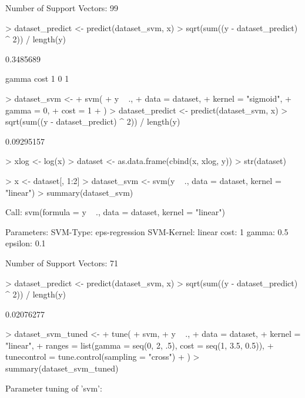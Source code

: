 \documentclass{article}
\begin{document}
\begin{Schunk}
\begin{Soutput}
Number of Support Vectors:  99
\end{Soutput}
\begin{Sinput}
> dataset_predict <- predict(dataset_svm, x)
> sqrt(sum((y - dataset_predict) ^ 2)) / length(y)
\end{Sinput}
\begin{Soutput}
[1] 0.3485689
\end{Soutput}
\begin{Soutput}
  gamma cost
1     0    1
\end{Soutput}
\begin{Sinput}
> dataset_svm <-
+   svm(
+     y ~ .,
+     data = dataset,
+     kernel = "sigmoid",
+     gamma = 0,
+     cost = 1
+   )
> dataset_predict <- predict(dataset_svm, x)
> sqrt(sum((y - dataset_predict) ^ 2)) / length(y)
\end{Sinput}
\begin{Soutput}
[1] 0.09295157
\end{Soutput}
\begin{Sinput}
> xlog <- log(x)
> dataset <- as.data.frame(cbind(x, xlog, y))
> str(dataset)
\end{Sinput}
\begin{Sinput}
> x <- dataset[, 1:2]
> dataset_svm <- svm(y ~ ., data = dataset, kernel = "linear")
> summary(dataset_svm)
\end{Sinput}
\begin{Soutput}
Call:
svm(formula = y ~ ., data = dataset, kernel = "linear")


Parameters:
   SVM-Type:  eps-regression 
 SVM-Kernel:  linear 
       cost:  1 
      gamma:  0.5 
    epsilon:  0.1 


Number of Support Vectors:  71
\end{Soutput}
\begin{Sinput}
> dataset_predict <- predict(dataset_svm, x)
> sqrt(sum((y - dataset_predict) ^ 2)) / length(y)
\end{Sinput}
\begin{Soutput}
[1] 0.02076277
\end{Soutput}
\begin{Sinput}
> dataset_svm_tuned <-
+   tune(
+     svm,
+     y ~ .,
+     data = dataset,
+     kernel = "linear",
+     ranges = list(gamma = seq(0, 2, .5), cost = seq(1, 3.5, 0.5)),
+     tunecontrol = tune.control(sampling = "cross")
+   )
> summary(dataset_svm_tuned)
\end{Sinput}
\begin{Soutput}
Parameter tuning of 'svm':


\end{Soutput}
\end{Schunk}
\end{document}
